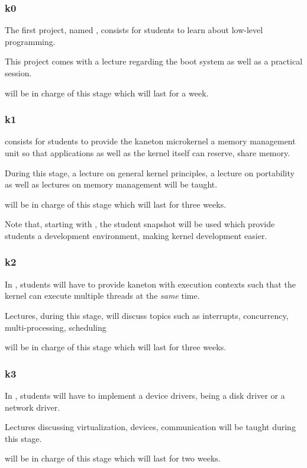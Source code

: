 \begin{frame}
  \frametitle{k0}

  The first project, named , consists for students to learn
  about low-level programming.

  \-

  This project comes with a lecture regarding the boot system as well
  as a practical session.

  \-

   will be in charge of this stage which will last for
  a week.
\end{frame}


\begin{frame}
  \frametitle{k1}

   consists for students to provide the kaneton microkernel a
  memory management unit so that applications as well as the kernel itself
  can reserve, share \etc{} memory.

  \-

  During this stage, a lecture on general kernel principles, a lecture on
  portability as well as lectures on memory management will be taught.

  \-

   will be in charge of this stage which will last
  for three weeks.

  \-

  Note that, starting with , the student snapshot will be used which
  provide students a development environment, making kernel development easier.
\end{frame}


\begin{frame}
  \frametitle{k2}

  In , students will have to provide kaneton with execution contexts
  such that the kernel can execute multiple threads at the \textit{same} time.

  \-

  Lectures, during this stage, will discuss topics such as interrupts,
  concurrency, multi-processing, scheduling \etc{}

  \-

   will be in charge of this stage which will last for
  three weeks.
\end{frame}


\begin{frame}
  \frametitle{k3}

  In , students will have to implement a device drivers, being
  a disk driver or a network driver.

  \-

  Lectures discussing virtualization, devices, communication \etc{} will
  be taught during this stage.

  \-

   will be in charge of this stage which will last for
  two weeks.
\end{frame}

